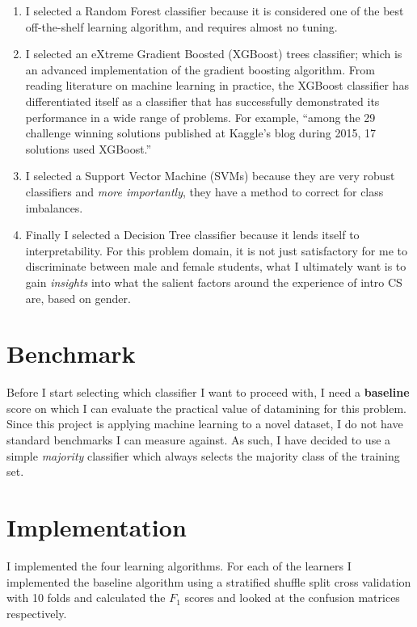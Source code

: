 \begin{enumerate}%
\item I selected a Random Forest classifier because it is considered one of the best off-the-shelf learning algorithm, and requires almost no tuning. 

\item I selected an eXtreme Gradient Boosted (XGBoost) trees classifier; which is an advanced implementation of the gradient boosting algorithm. From reading literature on machine learning in practice, the XGBoost classifier has differentiated itself as a classifier that has successfully demonstrated its performance in a wide range of problems. For example, ``among the 29 challenge winning solutions published at Kaggle's blog during 2015, 17 solutions used XGBoost.''

\item I selected a Support Vector Machine (SVMs) because they are very robust classifiers and \textit{more importantly}, they have a method to correct for class imbalances. 
              
\item Finally I selected a Decision Tree classifier because it lends itself to interpretability. For this problem domain, it is not just satisfactory for me to discriminate between male and female students, what I ultimately want is to gain \textit{insights} into what the salient factors around the experience of intro CS are, based on gender.

\end{enumerate}

\section*{Benchmark}

Before I start selecting which classifier I want to proceed with, I need a \textbf{baseline} score on which I can evaluate the practical value of datamining for this problem. Since this project is applying machine learning to a novel dataset, I do not have standard benchmarks I can measure against. As such, I have decided to use a simple \textit{majority} classifier which always selects the majority class of the training set. 

\section*{Implementation}
I implemented the four learning algorithms. For each of the learners I implemented the baseline algorithm using a stratified shuffle split cross validation with 10 folds and calculated the $F_1$ scores and looked at the confusion matrices respectively. 


